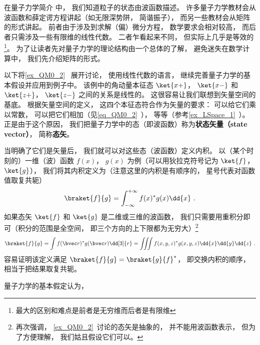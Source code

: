 

在量子力学简介 中， 我们知道粒子的状态由波函数描述。 许多量子力学教材会从波函数和薛定谔方程讲起（如无限深势阱， 简谐振子）， 而另一些教材会从矩阵的形式讲起。 前者由于涉及到求解（偏）微分方程， 数学要求会相对较高， 而后者只需涉及一些有限维的线性代数。 二者乍看起来不同， 但实际上几乎是等效的\footnote{最大的区别和难点是前者是无穷维而后者是有限维}。 为了让读者先对量子力学的理论结构由一个总体的了解， 避免迷失在数学计算中， 我们先介绍矩阵的形式。

以下将\autoref{ex_QM0_2}~ 展开讨论， 使用线性代数的语言， 继续完善量子力学的基本假设并应用到例子中。 该例中的角动量本征态 $\ket{x+}$， $\ket{x-}$ 和 $\ket{z+}$， $\ket{z-}$ 之间的关系是线性的。 这很容易让我们联想到矢量空间的基底。 根据矢量空间的定义， 这四个本征态符合作为矢量的要求： 可以给它们乘以常数， 可以把它们相加（见\autoref{eq_QM0_2}~）， 等等（参考\autoref{ex_LSpace_1}~）。 正是由于这个原因， 我们把量子力学中的态（即波函数）称为\textbf{状态矢量（state vector）}， 简称\textbf{态矢}。

当明确了它们是矢量后， 我们就可以对这些态（波函数）定义内积。 以（某个时刻的）一维（波）函数 $f(x)$， $g(x)$ 为例（可以用狄拉克符号记为 $\ket{f}$， $\ket{g}$）， 我们将其内积定义为（注意这里的内积是有顺序的， 星号代表对函数值取复共轭）%
\begin{equation}
\braket{f}{g} = \int_{-\infty}^{+\infty} f(x)^* g(x) \dd{x}~.
\end{equation}
如果态矢 $\ket{f}$ 和 $\ket{g}$ 是二维或三维的波函数， 我们只需要用重积分即可（积分的范围是全空间， 即三个方向的上下限都为无穷大）\footnote{再次强调， \autoref{ex_QM0_2}~讨论的态矢是抽象的， 并不能用波函数表示， 但为了方便理解， 我们姑且假设它们可以。}
\begin{equation}
\braket{f}{g} = \int f(\bvec r)^* g(\bvec r) \dd[3]{r} = \iiint f(x, y, z)^* g(x, y, z) \dd{x}\dd{y}\dd{z}~.
\end{equation}
容易证明该定义满足 $\braket{f}{g} = \braket{g}{f}^*$， 即交换内积的顺序， 相当于把结果取复共轭。


量子力学的基本假定认为，




